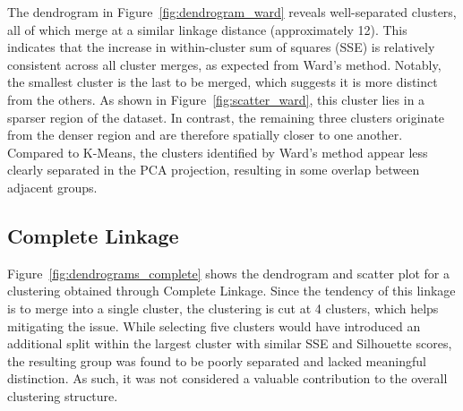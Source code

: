 The dendrogram in Figure~\ref{fig:dendrogram_ward} reveals well-separated clusters, all of which merge at a
similar linkage distance (approximately 12). This indicates that the increase in within-cluster sum of
squares (SSE) is relatively consistent across all cluster merges, as expected from Ward's method.
Notably, the smallest cluster is the last to be merged, which suggests it is more distinct from the others.
As shown in Figure~\ref{fig:scatter_ward}, this cluster lies in a sparser region of the dataset.
In contrast, the remaining three clusters originate from the denser region and are therefore spatially
closer to one another.
Compared to K-Means, the clusters identified by Ward's method appear less clearly separated in the PCA
projection, resulting in some overlap between adjacent groups.



\subsection{Complete Linkage}
Figure~\ref{fig:dendrograms_complete} shows the dendrogram and scatter plot for a clustering obtained
through Complete Linkage.
Since the tendency of this linkage is to merge into a single cluster, the clustering is cut at 4 clusters,
which helps mitigating the issue. While selecting five clusters would have introduced an additional split
within the largest cluster with similar SSE and Silhouette scores, the resulting group was found to be
poorly separated and lacked meaningful distinction.
As such, it was not considered a valuable contribution to the overall clustering structure.\\

